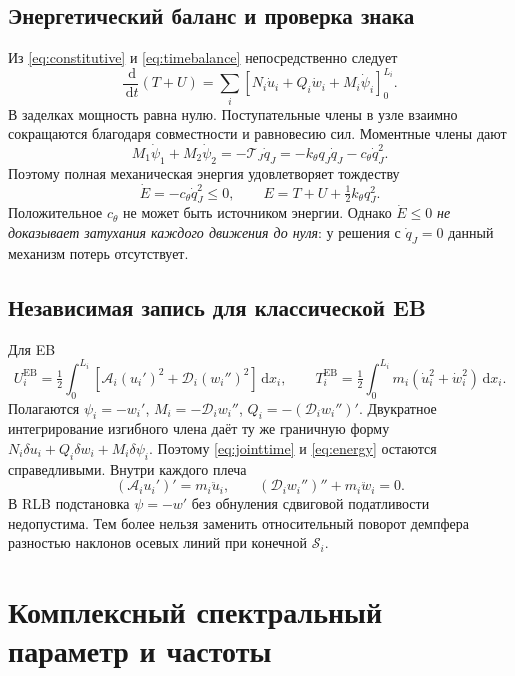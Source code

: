 \documentclass[11pt,a4paper]{article}
\numberwithin{equation}{section}
\newcommand{\dd}{\,\mathrm d}
\newcommand{\A}{\mathcal A}
\newcommand{\D}{\mathcal D}
\newcommand{\Sbeam}{\mathcal S}
\newcommand{\kth}{k_\theta}
\newcommand{\cth}{c_\theta}
\newcommand{\qJ}{q_J}
\newcommand{\TJ}{\mathcal T_J}
\begin{document}
\subsection{Энергетический баланс и проверка знака}

Из \eqref{eq:constitutive} и \eqref{eq:timebalance} непосредственно следует
\[
 \frac{\dd}{\dd t}(T+U)
 =\sum_i[N_i\dot u_i+Q_i\dot w_i+M_i\dot\psi_i]_0^{L_i}.
\]
В заделках мощность равна нулю. Поступательные члены в узле взаимно
сокращаются благодаря совместности и равновесию сил. Моментные члены дают
\[
 M_1\dot\psi_1+M_2\dot\psi_2
 =-\TJ\dot\qJ
 =-\kth\qJ\dot\qJ-\cth\dot\qJ^2.
\]
Поэтому полная механическая энергия удовлетворяет тождеству
\begin{equation}
 \boxed{\dot E=-\cth\dot\qJ^2\le0,
 \qquad E=T+U+\tfrac12\kth\qJ^2.}
 \label{eq:energy}
\end{equation}
Положительное $\cth$ не может быть источником энергии. Однако
$\dot E\le0$ \emph{не доказывает затухания каждого движения до нуля}:
у решения с $\dot\qJ=0$ данный механизм потерь отсутствует.

\subsection{Независимая запись для классической EB}

Для EB
\begin{equation}
 U_i^{\mathrm{EB}}=\tfrac12\int_0^{L_i}
 [\A_i(u_i')^2+\D_i(w_i'')^2]\dd x_i,\qquad
 T_i^{\mathrm{EB}}=\tfrac12\int_0^{L_i}m_i(\dot u_i^2+\dot w_i^2)\dd x_i.
 \label{eq:ebenergies}
\end{equation}
Полагаются $\psi_i=-w_i'$, $M_i=-\D_iw_i''$,
$Q_i=-(\D_iw_i'')'$. Двукратное интегрирование изгибного члена
даёт ту же граничную форму $N_i\delta u_i+Q_i\delta w_i+M_i\delta\psi_i$.
Поэтому \eqref{eq:jointtime} и \eqref{eq:energy} остаются справедливыми.
Внутри каждого плеча
\begin{equation}
 (\A_i u_i')'=m_i\ddot u_i,
 \qquad
 (\D_i w_i'')''+m_i\ddot w_i=0.
 \label{eq:ebpde}
\end{equation}
В RLB подстановка $\psi=-w'$ без обнуления сдвиговой податливости
недопустима. Тем более нельзя заменить относительный поворот демпфера
разностью наклонов осевых линий при конечной $\Sbeam_i$.

\section{Комплексный спектральный параметр и частоты}
\label{sec:spectral}
\end{document}
